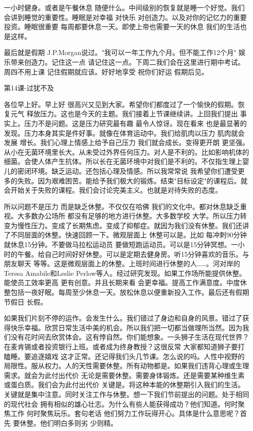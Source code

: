 一小时健身。或者是午餐休息 随便什么。中间级别的恢复就是睡一个好觉。我们会讲到睡觉的重要性。睡眠是对幸福 对快乐 对创造力。以及对你的记忆力的重要投资。睡眠很重要 每周都要休息一天。即使上帝也需要一天的休息 我们的生活也是这样。 

最后就是假期 J.P.Morgan说过。"我可以一年工作九个月。但不能工作12个月" 娱乐带来创造力。记住这一点 请记住这一点。下周二我们会在这里进行期中考试。周四不用上课 记住假期就应该。好好地享受 祝你们好运 假期后见。 

第14课-过犹不及 

各位早上好。早上好 很高兴又见到大家。希望你们都度过了一个愉快的假期。恢复元气 释放压力。这也是今天的主题。我们接着上节课继续讲。上回我们提出 事实上。压力不是问题。这是压力研究最有趣 最令人惊讶。现在看来 也是最显著的发现。压力本身其实是件好事。就像在体育运动中。我们给肌肉以压力 肌肉就会发展 增长。我们心理上情感上给予自己压力 我们就会成长。变得更开朗 更坚强。从小在无菌环境里长大。从未受过外界任何压力。对人是不利的。比如影响机体的细菌。会使人体产生抗体。所以长在无菌环境中对我们是不利的。不仅指生理上婴儿的密闭环境。缺乏运动。还包括心理及情感。所以我常常说 我希望你们遭受更多的失败。因为艰难困苦。能给予我们极大的锻炼。结束"目标设定"的课程后。就会开始关于失败的课程。我们会讨论完美主义。也就是对待失败的态度。 

所以问题不是压力 而是缺乏休整。不仅仅在哈佛 我们的文化中。都对休息缺乏重视。大多数办公场所 都没有足够的地方进行休整。大多数学校 大学。所以压力转变为慢性压力。变成了长期焦虑。变成了抑郁症。就因为我们没有休整。我们还讲了不同层面的休整。快速回顾一下。微观层面上 休整可以是。比如 每冲刺90分钟 就休息15分钟。不要做马拉松运动员 要做短跑运动员。可以是15分钟冥想。一小时的午餐。给自己时间好好休整。可以是定期去健身房。听15分钟喜欢的音乐。与朋友聊天 等等。这是微观层面上的休整。上班时间进行休整的人……。河对岸的Teresa Amabile和Leslie Perlow等人。经过研究发现。如果工作场所能提供休整。能使员工效率更高 更有创意。并且长期来看 会更幸福。提高工作满意度。中度休整包括一夜好眠。每周至少休息一天。放松休息以便重新投入工作。最后还有假期 节假日 长假。 

如果我们片刻不停的运作。会发生什么。我们错过了身边和自身的风景。错过了获得快乐幸福。欣赏日常生活中美的机会。所以我们把一切都当做理所当然。因为我们没有花时间去欣赏体会。这有悖自然。你们能想象。一头狮子生活在现代世界？在麦肯锡或者投资银行上班。或者成为终身教授？这很反常 大家都知道狮子要打瞌睡。要追逐嬉戏 这才正常。还记得我们头几节课。怎么说的吗。人性中视野的局限性。服从权力。人的天性需要休整。所有动物都是。如果我们违背心理或生理需求。就会为此付出代价 无论是需要休整。需要身体锻炼。还是需要某种维生素或蛋白质。我们会为此付出代价 关键是。将这种本能的休整期引入我们的生活。关键就是集中注意。同时关注工作与休整。想一下我们节前提出的问题。处于相同的现代社会 拥有相似的雄心壮志。为什么有些人能获得成功？他们知道。何时聚焦工作 何时聚焦玩乐。套句老话 他们努力工作玩得开心。具体是什么意思呢？首先 要休整。他们明白多则劣 少则精。 

